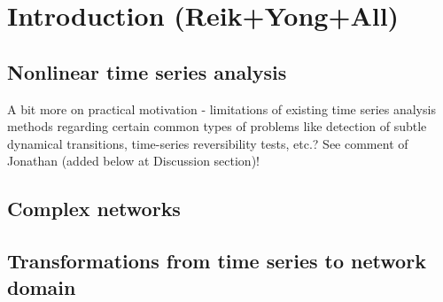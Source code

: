 \section{Introduction {\bf{(Reik+Yong+All)}}}

\subsection{Nonlinear time series analysis}

A bit more on practical motivation - limitations of existing time series
analysis methods regarding certain common types of problems like detection of
subtle dynamical transitions, time-series reversibility tests, etc.? See comment
of Jonathan (added below at Discussion section)!

\subsection{Complex networks}
\subsection{Transformations from time series to network domain}
\cite{Donner2010NJP,marwan2007}
